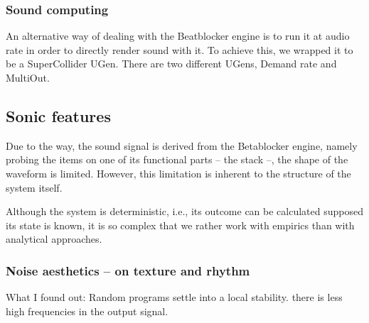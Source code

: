 \documentclass[letterpaper, 12pt]{article}
\begin{document}
\subsubsection{Sound computing} 
\label{sub:sound_computing}

An alternative way of dealing with the Beatblocker engine is to run it at audio rate in order to directly render sound with it.
To achieve this, we wrapped it to be a SuperCollider UGen.
There are two different UGens, Demand rate and MultiOut.






\subsection{Sonic features} 
\label{sub:sonic_features}




Due to the way, the sound signal is derived from the Betablocker engine, namely probing the items on one of its functional parts -- the stack --, the shape of the waveform is limited. 
However, this limitation is inherent to the structure of the system itself.

Although the system is deterministic, i.e., its outcome can be calculated supposed its state is known, it is so complex that we rather work with empirics than with analytical approaches.

\subsubsection{Noise aesthetics -- on texture and rhythm} 
\label{sub:noise_aesthetics}


What I found out: Random programs settle into a local stability. there is less high frequencies in the output signal. 
\end{document}
